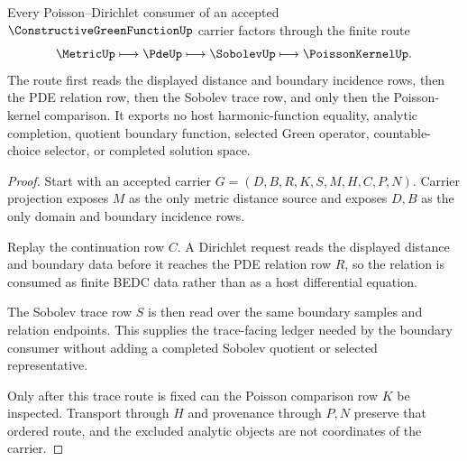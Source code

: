\begin{theorem}
\label{thm:constructive-green-function-poisson-dirichlet-handoff}
Every Poisson--Dirichlet consumer of an accepted $\ConstructiveGreenFunctionUp$ carrier factors through the finite route
$$
\MetricUp \longmapsto \PdeUp \longmapsto \SobolevUp \longmapsto \PoissonKernelUp .
$$
The route first reads the displayed distance and boundary incidence rows, then the PDE relation row, then the Sobolev trace row, and only then the Poisson-kernel comparison. It exports no host harmonic-function equality, analytic completion, quotient boundary function, selected Green operator, countable-choice selector, or completed solution space.
\end{theorem}
\begin{proof}
Start with an accepted carrier $G=(D,B,R,K,S,M,H,C,P,N)$. Carrier projection exposes $M$ as the only metric distance source and exposes $D,B$ as the only domain and boundary incidence rows.

Replay the continuation row $C$. A Dirichlet request reads the displayed distance and boundary data before it reaches the PDE relation row $R$, so the relation is consumed as finite BEDC data rather than as a host differential equation.

The Sobolev trace row $S$ is then read over the same boundary samples and relation endpoints. This supplies the trace-facing ledger needed by the boundary consumer without adding a completed Sobolev quotient or selected representative.

Only after this trace route is fixed can the Poisson comparison row $K$ be inspected. Transport through $H$ and provenance through $P,N$ preserve that ordered route, and the excluded analytic objects are not coordinates of the carrier.
\end{proof}



